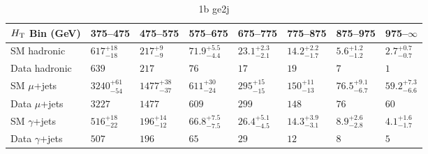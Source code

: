 \documentclass[8pt]{article}
\def\scalht{\mbox{$H_{\rm{T}}$}\xspace}
\newcommand\T{\rule{0pt}{2.6ex}}
\newcommand\B{\rule[-1.2ex]{0pt}{0pt}}
\begin{document}
\begin{table}[ht!]
\caption{1b ge2j}
\label{tab:ensemble-1b ge2j}
\centering
\begin{tabular}{ llllllll }

\hline
\scalht Bin (GeV)       & 375--475                       & 475--575                       & 575--675                       & 675--775                       & 775--875                       & 875--975                       & 975--$\infty$                  \\ [1.000000ex]
\hline
SM hadronic\T           & $617^{+18}_{-18}$              & $217^{+9}_{-9}$                & $71.9^{+5.5}_{-4.4}$           & $23.1^{+2.3}_{-2.1}$           & $14.2^{+2.2}_{-1.7}$           & $5.6^{+1.2}_{-1.2}$            & $2.7^{+0.7}_{-0.7}$            \\ 
Data hadronic\B         & $639$                          & $217$                          & $76$                           & $17$                           & $19$                           & $7$                            & $1$                            \\ 
\hline
SM $\mu$+jets\T         & $3240^{+61}_{-54}$             & $1477^{+38}_{-37}$             & $611^{+30}_{-24}$              & $295^{+15}_{-15}$              & $150^{+11}_{-13}$              & $76.5^{+9.1}_{-6.7}$           & $59.2^{+7.3}_{-6.6}$           \\ 
Data $\mu$+jets\B       & $3227$                         & $1477$                         & $609$                          & $299$                          & $148$                          & $76$                           & $60$                           \\ 
\hline
SM $\gamma$+jets\T      & $516^{+18}_{-22}$              & $196^{+14}_{-12}$              & $66.8^{+7.5}_{-7.5}$           & $26.4^{+5.1}_{-4.5}$           & $14.3^{+3.9}_{-3.1}$           & $8.9^{+2.6}_{-2.8}$            & $4.1^{+1.6}_{-1.7}$            \\ 
Data $\gamma$+jets\B    & $507$                          & $196$                          & $65$                           & $29$                           & $12$                           & $8$                            & $5$                            \\ 
\hline

\end{tabular}
\end{table}
\end{document}
